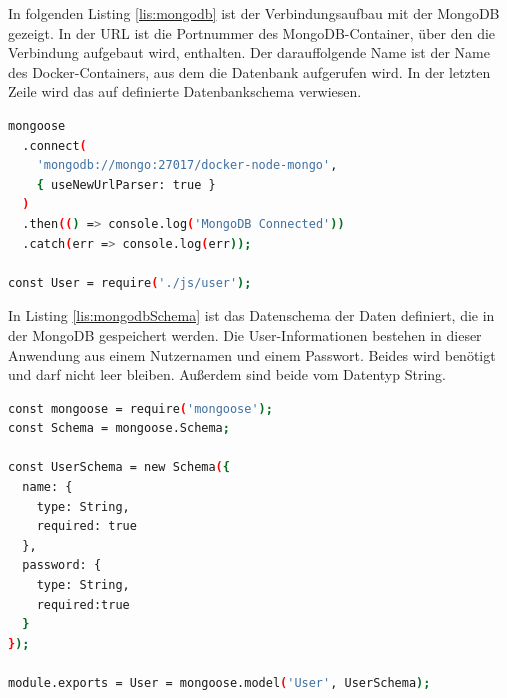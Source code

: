 In folgenden Listing \ref{lis:mongodb} ist der Verbindungsaufbau mit der MongoDB gezeigt. In der URL ist die Portnummer des MongoDB-Container, über den die Verbindung aufgebaut wird, enthalten. Der darauffolgende Name ist der Name des Docker-Containers, aus dem die Datenbank aufgerufen wird.
In der letzten Zeile wird das auf definierte Datenbankschema verwiesen. 

\begin{lstlisting}[language=bash, caption={Verbindungsaufbau mit der MongoDB}, label=lis:mongodb]
mongoose
  .connect(
    'mongodb://mongo:27017/docker-node-mongo',
    { useNewUrlParser: true }
  )
  .then(() => console.log('MongoDB Connected'))
  .catch(err => console.log(err));

const User = require('./js/user');
\end{lstlisting}

In Listing \ref{lis:mongodbSchema} ist das Datenschema der Daten definiert, die in der MongoDB gespeichert werden. Die User-Informationen bestehen in dieser Anwendung aus einem Nutzernamen und einem Passwort. Beides wird benötigt und darf nicht leer bleiben. Außerdem sind beide vom Datentyp String.
\begin{lstlisting}[language=bash, caption={Datenschema in der MongoDB}, label=lis:mongodbSchema]
const mongoose = require('mongoose');
const Schema = mongoose.Schema;

const UserSchema = new Schema({
  name: {
    type: String,
    required: true
  },
  password: {
    type: String,
    required:true
  }
});

module.exports = User = mongoose.model('User', UserSchema);
\end{lstlisting}
